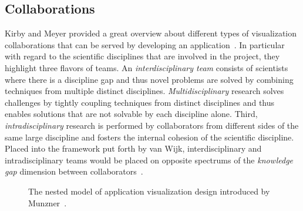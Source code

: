 \subsection{Collaborations} \label{cha:intro:appl:collab}
Kirby and Meyer provided a great overview about different types of visualization collaborations that can be served by developing an application~\cite{kirby2013visualization}.  In particular with regard to the scientific disciplines that are involved in the project, they highlight three flavors of teams. An \emph{interdisciplinary team} consists of scientists where there is a discipline gap and thus novel problems are solved by combining techniques from multiple distinct disciplines.  \emph{Multidisciplinary} research solves challenges by tightly coupling techniques from distinct disciplines and thus enables solutions that are not solvable by each discipline alone.  Third, \emph{intradisciplinary} research is performed by collaborators from different sides of the same large discipline and fosters the internal cohesion of the scientific discipline.  Placed into the framework put forth by van Wijk, interdisciplinary and intradisciplinary teams would be placed on opposite spectrums of the \emph{knowledge gap} dimension between collaborators~\cite{van2006bridging}.

\begin{figure}
  \centering
  \caption{The nested model of application visualization design introduced by Munzner~\cite{munzner2009nested}.}
  \label{fig:intro:appl:nested}
\end{figure}


